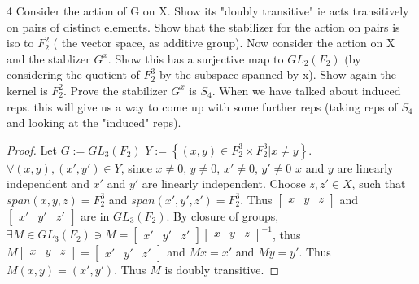 \documentclass{article}
\begin{document}
\begin{PROB}{4}\label{Problem 4.}
    Consider the action of G on X. Show its "doubly transitive" ie acts transitively on pairs of distinct elements. Show that the stabilizer for the action on pairs is iso to $F_2^2$ ( the vector space, as additive group). Now consider the action on X and the stablizer $G^x$. Show this has a surjective map to $GL_2(F_2)$ (by considering the quotient of $F_2^3$ by the subspace spanned by x). Show again the kernel is $F_2^2$. Prove the stabilizer $G^x$ is $S_4$.   When we have talked about induced reps. this will give us a way to come up with some further reps (taking reps of $S_4$ and looking at the "induced" reps). 
\end{PROB}
\begin{proof}
    Let $G := GL_3(F_2)$ 
    $Y := \left\{ (x, y) \in F_2^3 \times F_2^3 | x \neq y \right\}$. $\forall (x, y), (x', y') \in Y$, since $x \neq 0$, $y \neq 0$, $x' \neq 0$, $y' \neq 0$ $x$ and $y$ are linearly independent and $x'$ and $y'$ are linearly independent. Choose $z, z' \in X$, such that $span(x, y, z) = F_2^3$ and $span(x', y', z') = F_2^3$. Thus $\begin{bmatrix}
        x & y & z
    \end{bmatrix}$ and $\begin{bmatrix}
        x' & y' & z'
    \end{bmatrix}$ are in $GL_3(F_2)$. By closure of groups, $\exists M \in GL_3(F_2) \ni M = \begin{bmatrix}
        x' & y' & z'
    \end{bmatrix} \begin{bmatrix}
        x & y & z
    \end{bmatrix}^{-1}$, thus $M\begin{bmatrix}
        x & y & z
    \end{bmatrix} = \begin{bmatrix}
        x' & y' & z'
    \end{bmatrix}$ and $Mx =x'$ and $My = y'$. Thus $M(x, y) = (x', y')$. Thus $M$ is doubly transitive.
    

\end{proof}
\end{document}
